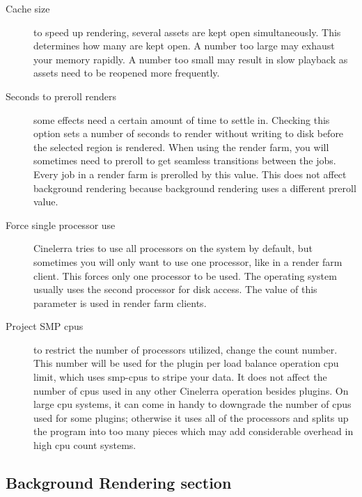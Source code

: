 \begin{description}
    \item[Cache size] to speed up rendering, several assets are kept open simultaneously. This determines how     many are kept open. A number too large may exhaust your memory rapidly. A number too small may result in slow playback as assets need to be reopened more frequently.
    \item[Seconds to preroll renders] some effects need a certain amount of time to settle in. Checking this option sets a number of seconds to render without writing to disk before the selected region is rendered. When using the render farm, you will sometimes need to preroll to get seamless transitions between the     jobs. Every job in a render farm is prerolled by this value. This does not affect background rendering because background rendering uses a different preroll value.
    \item[Force single processor use] Cinelerra tries to use all processors on the system by default, but sometimes you will only want to use one processor, like in a render farm client. This forces only one processor to be used.  The operating system usually uses the second processor for disk access. The value of this parameter is used in render farm clients.
    \item[Project SMP cpus ] to restrict the number of processors utilized, change the count number.  This number will be used for the plugin per load balance operation cpu limit, which uses smp-cpus to stripe your data. It does not affect the number of cpus used in any other Cinelerra operation besides plugins. On large cpu systems, it can come in handy to downgrade the number of cpus used for some plugins; otherwise it uses all of the processors and splits up the program into too many pieces which may add
    considerable overhead in high cpu count systems.
\end{description}

\subsection{Background Rendering section}%
\label{sub:background_rendering_section}

